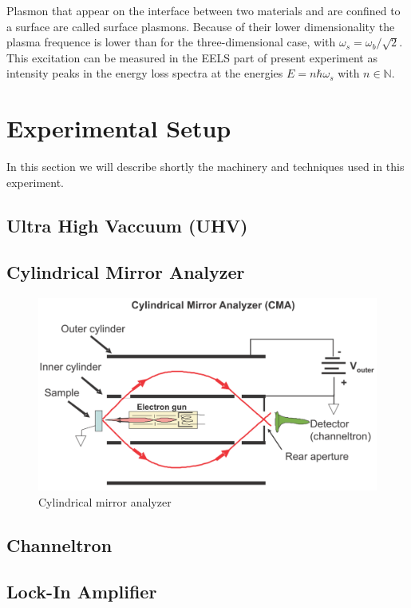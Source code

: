 \documentclass[a4paper,10pt]{scrartcl}
\begin{document}
Plasmon that appear on the interface between two materials and are confined to a surface are called surface plasmons. Because of their lower dimensionality the plasma frequence is lower than for the three-dimensional case, with $\omega_{s} = \omega_{b}/\sqrt{2}$. This excitation can be measured in the EELS part of present experiment as intensity peaks in the energy loss spectra at the energies $E=n \hbar \omega_{s}$ with $n \in \mathbb{N}$.

\section{Experimental Setup}

In this section we will describe shortly the machinery and techniques used in this experiment.

\subsection{Ultra High Vaccuum (UHV)}



\subsection{Cylindrical Mirror Analyzer}

\begin{figure}
\centering
\includegraphics[scale=0.35]{img/cma}
\caption{Cylindrical mirror analyzer \label{fig:cma}}
\end{figure}


\subsection{Channeltron}

\subsection{Lock-In Amplifier}
\end{document}
